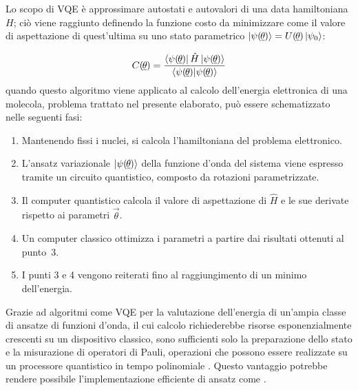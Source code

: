 Lo scopo di VQE è approssimare autostati e autovalori di una data hamiltoniana $H$; ciò viene raggiunto definendo la funzione costo da minimizzare come il valore di aspettazione di quest'ultima su uno stato parametrico $\ket{\psi(\underline{\hspace{-0.1em}\theta\hspace{-0.05em}})} = U(\underline{\hspace{-0.1em}\theta\hspace{-0.05em}})\ket{\psi_0}$:

\begin{equation}\label{eqn:cost-function}
    C(\underline{\hspace{-0.1em}\theta\hspace{-0.05em}}) = \frac{\bra{\psi(\underline{\hspace{-0.1em}\theta\hspace{-0.05em}})} \hat{H} \ket {\psi(\underline{\hspace{-0.1em}\theta\hspace{-0.05em}})}}{\braket{\psi(\underline{\hspace{-0.1em}\theta\hspace{-0.05em}})}{\psi(\underline{\hspace{-0.1em}\theta\hspace{-0.05em}})}}
\end{equation}
\newline
quando questo algoritmo viene applicato al calcolo dell'energia elettronica di una molecola, problema trattato nel presente elaborato, può essere schematizzato nelle seguenti fasi:

\begin{enumerate}
    \item Mantenendo fissi i nuclei, si calcola l'hamiltoniana del problema elettronico.
    \item L'ansatz variazionale $\ket{\psi(\underline{\hspace{-0.1em}\theta\hspace{-0.05em}})}$ della funzione d'onda del sistema viene espresso tramite un circuito quantistico, composto da rotazioni parametrizzate.
    \item Il computer quantistico calcola il valore di aspettazione di $\hat{H}$ e le sue derivate rispetto ai parametri $\vec{\theta}$.
    \item Un computer classico ottimizza i parametri a partire dai risultati ottenuti al punto~3.
    \item I punti 3 e 4 vengono reiterati fino al raggiungimento di un minimo dell'energia.
\end{enumerate}

Grazie ad algoritmi come VQE per la valutazione dell’energia di un’ampia classe di ansatze di funzioni d’onda, il cui calcolo richiederebbe risorse esponenzialmente crescenti su un dispositivo classico, sono sufficienti solo la preparazione dello stato e la misurazione di operatori di Pauli, operazioni che possono essere realizzate su un processore quantistico in tempo polinomiale \cite{Lee_2018}. Questo vantaggio potrebbe rendere possibile l'implementazione efficiente di ansatz come .




